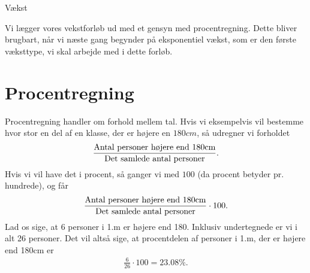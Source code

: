 \begin{center}
\Huge
Vækst
\end{center}
Vi lægger vores vekstforløb ud med et gensyn med procentregning. Dette bliver brugbart, når vi næste gang begynder på eksponentiel vækst, som er den første væksttype, vi skal arbejde med i dette forløb. 
\section*{Procentregning}

Procentregning handler om forhold mellem tal. Hvis vi eksempelvis vil bestemme hvor stor en del af en klasse, der er højere en $180cm$, så udregner vi forholdet 
\begin{align*}
	\frac{\textnormal{Antal personer højere end 180cm}}{\textnormal{Det samlede antal personer}}.
\end{align*}
 Hvis vi vil have det i procent, så ganger vi med $100$ (da procent betyder pr. hundrede), og får
\begin{align*}
	\frac{\textnormal{Antal personer højere end 180cm}}{\textnormal{Det samlede antal personer}}\cdot 100.
\end{align*}
Lad os sige, at 6 personer i 1.m er højere end 180. Inklusiv undertegnede er vi i alt 26 personer. Det vil altså sige, at procentdelen af personer i 1.m, der er højere end 180cm er 
\begin{align*}
\frac{6}{26}\cdot 100 = 23.08\%.
\end{align*}

